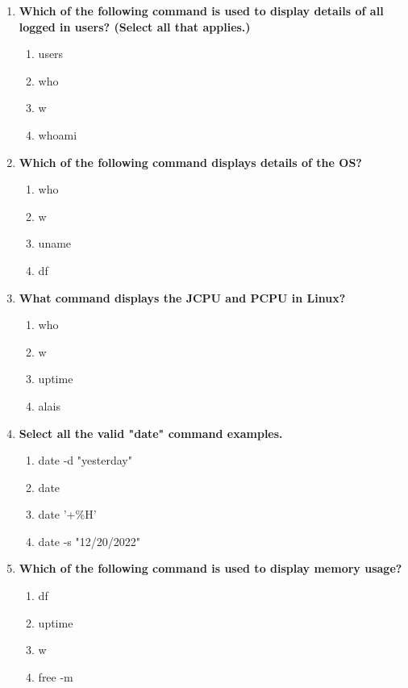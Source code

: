 \begin{flushleft}
\begin{enumerate}
		\bigskip
		\bigskip
		\item \textbf{Which of the following command is used to display details of all logged in users? (Select all that applies.)}
		\begin{enumerate}[label=(\alph*)]
			\item users  %
			\item who  %
			\item w  %
			\item whoami
		\end{enumerate}  
		\bigskip
		\bigskip
		\item \textbf{Which of the following command displays details of the OS?}
		\begin{enumerate}[label=(\alph*)]
			\item who
			\item w
			\item uname  %
			\item df
		\end{enumerate}  
		\bigskip
		\bigskip
		\item \textbf{What command displays the JCPU and PCPU in Linux?}
		\begin{enumerate}[label=(\alph*)]
			\item who
			\item w          %
			\item uptime
			\item alais
		\end{enumerate}  
		\bigskip
		\bigskip
		\newpage
		\item \textbf{Select all the valid "date" command examples.}
		\begin{enumerate}[label=(\alph*)]
			\item date -d "yesterday" %
			\item date     %
			\item date '+\%H'    %
			\item date -s "12/20/2022" %
		\end{enumerate}  
		\bigskip
		\bigskip
		\item \textbf{Which of the following command is used to display memory usage?}
		\begin{enumerate}[label=(\alph*)]
			\item df 
			\item uptime
			\item w
			\item free -m  %
		\end{enumerate}  

\end{enumerate}
\end{flushleft}
